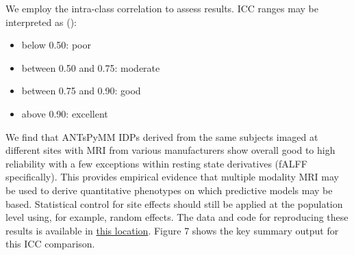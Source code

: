 \documentclass[
  table]{article}
\begin{document}
We employ the intra-class correlation to assess results. ICC ranges may
be interpreted as ():

\begin{itemize}
\item
  below 0.50: poor
\item
  between 0.50 and 0.75: moderate
\item
  between 0.75 and 0.90: good
\item
  above 0.90: excellent
\end{itemize}

We find that ANTsPyMM IDPs derived from the same subjects imaged at
different sites with MRI from various manufacturers show overall good to
high reliability with a few exceptions within resting state derivatives
(fALFF specifically). This provides empirical evidence that multiple
modality MRI may be used to derive quantitative phenotypes on which
predictive models may be based. Statistical control for site effects
should still be applied at the population level using, for example,
random effects. The data and code for reproducing these results is
available in
\href{https://github.com/stnava/antspymm_reproducibility}{this
location}. Figure 7 shows the key summary output for this ICC
comparison.
\end{document}
